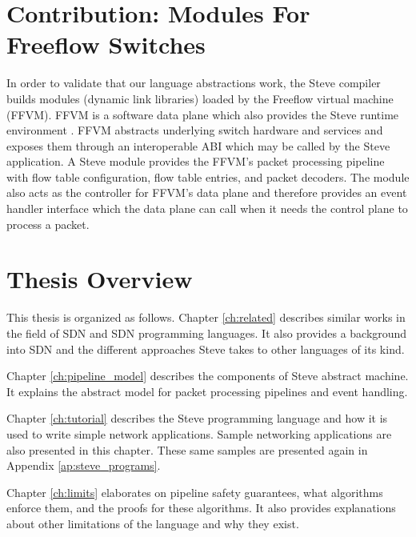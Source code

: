 
\section{Contribution: Modules For Freeflow Switches}

In order to validate that our language abstractions work, the Steve compiler builds modules (dynamic link libraries)
loaded by the Freeflow virtual machine (FFVM).
FFVM is a software data plane which also provides the Steve runtime environment \cite{freeflow_software}.
FFVM abstracts underlying switch
hardware and services and exposes them through an interoperable ABI which may be called by the Steve application.
A Steve module provides the FFVM's packet processing pipeline with
flow table configuration, flow table entries, and packet decoders.
The module also acts as the controller for FFVM's data plane and therefore provides an event handler interface which the data plane can call when it needs the control plane to process a packet.

\section{Thesis Overview}

This thesis is organized as follows. Chapter \ref{ch:related} describes similar
works in the field of SDN and SDN programming languages. It also provides a
background into SDN and the different approaches Steve takes to other languages
of its kind.

Chapter \ref{ch:pipeline_model} describes the components of Steve abstract machine. It explains the abstract model for packet processing pipelines and event handling.

Chapter \ref{ch:tutorial} describes the Steve programming language and how it is used to write simple network applications.
Sample networking applications are also presented in
this chapter. These same samples are presented again in Appendix
\ref{ap:steve_programs}.

Chapter \ref{ch:limits} elaborates on pipeline safety guarantees, what algorithms enforce them, and the proofs for these algorithms. It also provides explanations about other
limitations of the language and why they exist.

